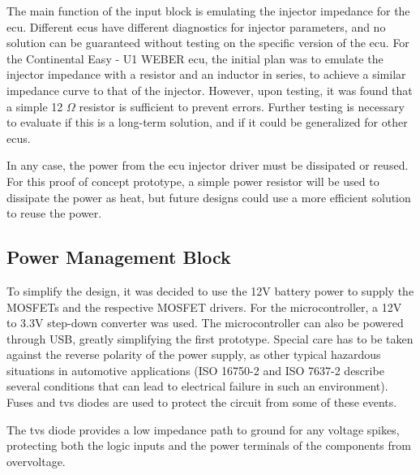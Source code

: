 

            The main function of the input block is emulating the injector impedance for the \gls{ecu}. Different \gls{ecu}s have different diagnostics for injector parameters, and no solution can be guaranteed without testing on the specific version of the \gls{ecu}. For the Continental Easy - U1 WEBER \gls{ecu}, the initial plan was to emulate the injector impedance with a resistor and an inductor in series, to achieve a similar impedance curve to that of the injector. However, upon testing, it was found that a simple 12 $\Omega$ resistor is sufficient to prevent errors. Further testing is necessary to evaluate if this is a long-term solution, and if it could be generalized for other \gls{ecu}s.

            In any case, the power from the \gls{ecu} injector driver must be dissipated or reused. For this proof of concept prototype, a simple power resistor will be used to dissipate the power as heat, but future designs could use a more efficient solution to reuse the power.

        \subsection{Power Management Block}

            To simplify the design, it was decided to use the 12V battery power to supply the MOSFETs and the respective MOSFET drivers. For the microcontroller, a 12V to 3.3V step-down converter was used. The microcontroller can also be powered through USB, greatly simplifying the first prototype. Special care has to be taken against the reverse polarity of the power supply, as other typical hazardous situations in automotive applications (ISO 16750-2 and ISO 7637-2 describe several conditions that can lead to electrical failure in such an environment). Fuses and \gls{tvs} diodes are used to protect the circuit from some of these events.

            The \gls{tvs} diode provides a low impedance path to ground for any voltage spikes, protecting both the logic inputs and the power terminals of the components from overvoltage.


